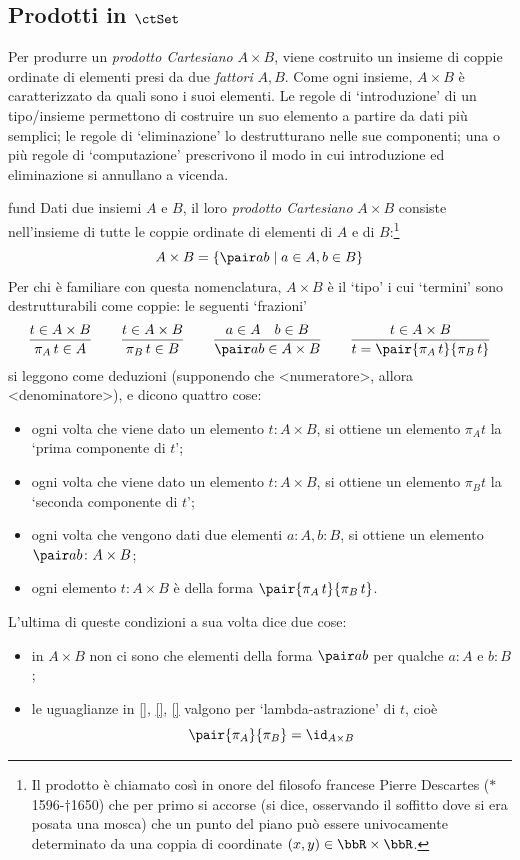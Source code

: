 \subsection{Prodotti in \(\ctSet\)}\label{prod_in_Set}
Per produrre un \emph{prodotto Cartesiano} \(A\times B\), viene costruito un insieme di coppie ordinate di elementi presi da due \emph{fattori}  \(A,B\). Come ogni insieme, \(A\times B\) è caratterizzato da quali sono i suoi elementi. Le regole di `introduzione' di un tipo/insieme permettono di costruire un suo elemento a partire da dati più semplici; le regole di `eliminazione' lo destrutturano nelle sue componenti; una o più regole di `computazione' prescrivono il modo in cui introduzione ed eliminazione si annullano a vicenda.
\begin{hExample}{fund}
	Dati due insiemi \(A\) e \(B\), il loro \emph{prodotto Cartesiano} \(A\times B\) consiste nell'insieme di tutte le coppie ordinate di elementi di \(A\) e di \(B\):\footnote{Il prodotto è chiamato così in onore del filosofo francese Pierre Descartes (\(*\)1596-\(\dag\)1650) che per primo si accorse (si dice, osservando il soffitto dove si era posata una mosca) che un punto del piano può essere univocamente determinato da una coppia di coordinate \((x,y)\in\bbR\times\bbR\).}
	\[
		A\times B= \{\pair ab \mid a\in A, b\in B\}
	\]
	Per chi è familiare con questa nomenclatura, \(A\times B\) è il `tipo' i cui `termini' sono destrutturabili come coppie: le seguenti `frazioni'
	\[\frac{t \in A\times B}{\pi_A\, t \in A}\qquad \frac{t \in A\times B}{\pi_B\, t \in B}\qquad \frac{a \in A\quad b \in B}{\pair ab \in A\times B}\qquad \frac{t \in A\times B}{t = \pair{\pi_A\, t}{\pi_B\, t}}\]
	si leggono come deduzioni (supponendo che <numeratore>, allora <denominatore>), e dicono quattro cose:
	\begin{itemize}
		\item ogni volta che viene dato un elemento \(t \colon A\times B\), si ottiene un elemento \(\pi_A t\) la `prima componente di \(t\)';
		\item ogni volta che viene dato un elemento \(t \colon A\times B\), si ottiene un elemento \(\pi_B t\) la `seconda componente di \(t\)';
		\item ogni volta che vengono dati due elementi \(a \colon A, b \colon B\), si ottiene un elemento \(\pair ab \colon A\times B\);
		\item ogni elemento \(t \colon A\times B\) è della forma \(\pair{\pi_A\, t}{\pi_B\, t}\).
	\end{itemize}
	L'ultima di queste condizioni a sua volta dice due cose:
	\begin{itemize}
		\item in \(A\times B\) non ci sono che elementi della forma \(\pair ab\) per qualche \(a \colon A\) e \(b \colon B\);
		\item le uguaglianze in \ref{}, \ref{}, \ref{} valgono per `lambda-astrazione' di \(t\), cioè
		      \[\pair{\pi_A}{\pi_B} = \id_{A\times B} \]
	\end{itemize}
\end{hExample}
